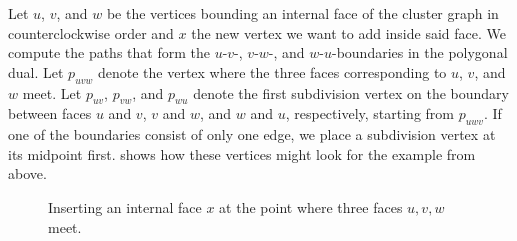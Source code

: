 Let $u$, $v$, and $w$ be the vertices bounding an internal face of the cluster graph in counterclockwise order and $x$ the new vertex we want to add inside said face. We compute the paths that form the $u$-$v$-, $v$-$w$-, and $w$-$u$-boundaries in the polygonal dual. Let $p_{uvw}$ denote the vertex where the three faces corresponding to $u$, $v$, and $w$ meet. Let $p_{uv}$, $p_{vw}$, and $p_{wu}$ denote the first subdivision vertex on the boundary between faces $u$ and $v$, $v$ and $w$, and $w$ and $u$, respectively, starting from $p_{uwv}$. If one of the boundaries consist of only one edge, we place a subdivision vertex at its midpoint first.  shows how these vertices might look for the example from above.

\begin{figure}[H]
	\centering
	\quad
	\quad
	\caption{Inserting an internal face $x$ at the point where three faces $u,v,w$ meet.}
	\label{fig:insert-vertex-inside-illustration}
\end{figure}

